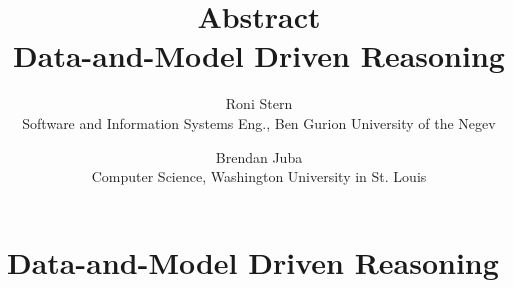 \documentclass[12pt]{article}
\begin{document}
\title{Abstract \\ \Large{Data-and-Model Driven Reasoning}}
\date{\vspace{-0.5cm}}
\author{Roni Stern \\ Software and Information Systems Eng., Ben Gurion University of the Negev
        \and Brendan Juba \\ Computer Science, Washington University in St. Louis}
\section*{Data-and-Model Driven Reasoning}




\end{document}
